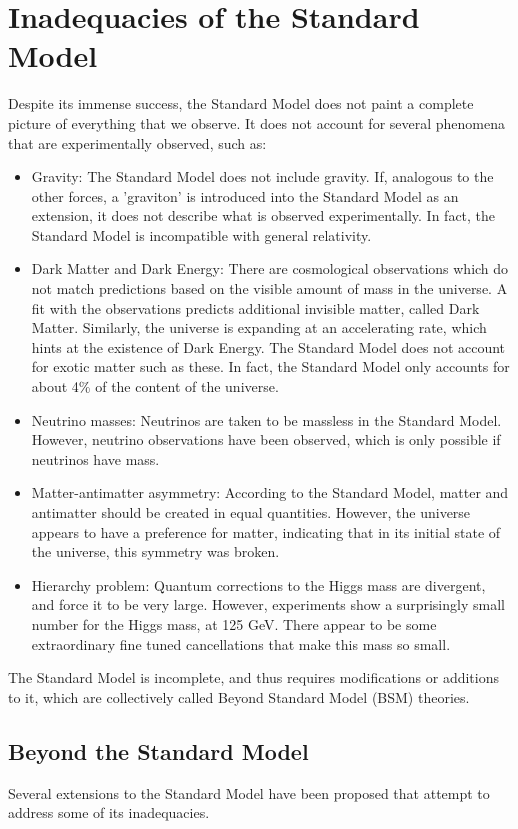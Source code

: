 \documentclass[11pt,a4paper,openright,twoside]{report}
\begin{document}
\section{Inadequacies of the Standard Model}
Despite its immense success, the Standard Model does not paint a complete picture of everything that we observe. It does not account for several phenomena that are experimentally observed, such as:
\begin{itemize}
\item Gravity: The Standard Model does not include gravity. If, analogous to the other forces, a 'graviton' is introduced into the Standard Model as an extension, it does not describe what is observed experimentally. In fact, the Standard Model is incompatible with general relativity.
\item Dark Matter and Dark Energy: There are cosmological observations which do not match predictions based on the visible amount of mass in the universe. A fit with the observations predicts additional invisible matter, called Dark Matter. Similarly, the universe is expanding at an accelerating rate, which hints at the existence of Dark Energy. The Standard Model does not account for exotic matter such as these. In fact, the Standard Model only accounts for about 4\% of the content of the universe.
\item Neutrino masses: Neutrinos are taken to be massless in the Standard Model. However, neutrino observations have been observed, which is only possible if neutrinos have mass.
\item Matter-antimatter asymmetry: According to the Standard Model, matter and antimatter should be created in equal quantities. However, the universe appears to have a preference for matter, indicating that in its initial state of the universe, this symmetry was broken.
\item Hierarchy problem: Quantum corrections to the Higgs mass are divergent, and force it to be very large. However, experiments show a surprisingly small number for the Higgs mass, at 125 GeV. There appear to be some extraordinary fine tuned cancellations that make this mass so small.
\end{itemize}

The Standard Model is incomplete, and thus requires modifications or additions to it, which are collectively called Beyond Standard Model (BSM) theories.

\subsection{Beyond the Standard Model}
Several extensions to the Standard Model have been proposed that attempt to address some of its inadequacies. 
\end{document}
